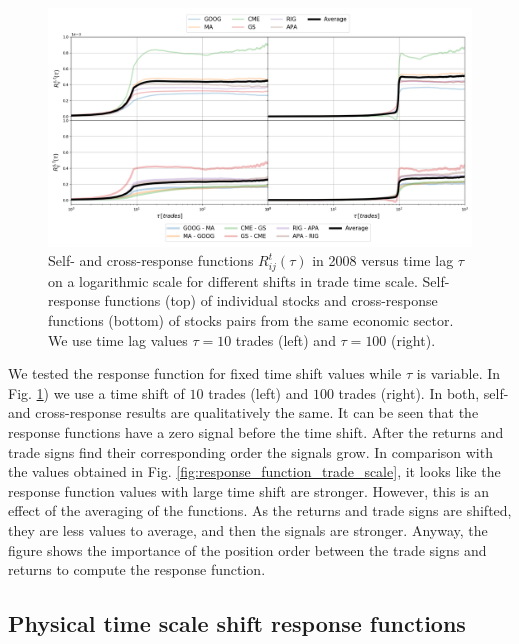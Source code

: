\begin{figure}[htbp]
    \centering
    \includegraphics[width=\textwidth]{figures/04_shift_responses_trade.png}
    \caption{Self- and cross-response functions $R^{t}_{ij}\left(\tau\right)$
             in 2008 versus time lag $\tau$ on a logarithmic scale for
             different shifts in trade time scale. Self-response functions
             (top) of individual stocks and cross-response functions (bottom)
             of stocks pairs from the same economic sector. We use time lag
             values $\tau=10$ trades (left) and $\tau=100$ (right).}
    \label{fig:shift_responses_trade_scale}
\end{figure}

We tested the response function for fixed time shift values while $\tau$ is
variable. In Fig. \ref{fig:shift_responses_trade_scale}) we use a time shift of
$10$ trades (left) and $100$ trades (right). In both, self- and cross-response
results are qualitatively the same. It can be seen that the response functions
have a zero signal before the time shift. After the returns and trade signs
find their corresponding order the signals grow. In comparison with the values
obtained in Fig. \ref{fig:response_function_trade_scale}, it looks like the
response function values with large time shift are stronger. However, this is
an effect of the averaging of the functions. As the returns and trade signs are
shifted, they are less values to average, and then the signals are stronger.
Anyway, the figure shows the importance of the position order between the trade
signs and returns to compute the response function.

\subsection{Physical time scale shift response functions}
\label{subsec:time_shift_physical}


